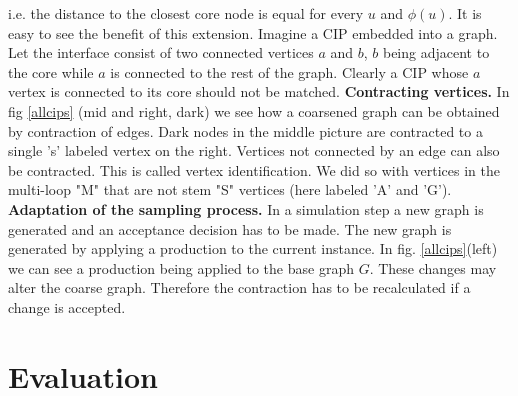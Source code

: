 \documentclass{article}
\begin{document}
i.e. the distance 
to the closest core node is equal for every
$u$ and $\phi(u)$.
It is easy to see the benefit of this extension.
Imagine a CIP embedded into a graph. Let the interface consist of
two connected vertices $a$ and $b$, $b$ being adjacent to the core while
$a$ is connected to the rest of the graph.
Clearly a CIP whose $a$ vertex is connected to its core should not be matched.
\textbf{Contracting vertices.}
In fig \ref{allcips} (mid and right, dark) we see how a coarsened 
graph can be obtained by contraction of edges.
Dark nodes in the middle picture are contracted to a single 's' labeled
vertex on the right. 
Vertices not connected by an edge can also be contracted.
This is called vertex identification.  
We did so with vertices in the multi-loop "M" that are not stem "S" vertices 
(here labeled 'A' and 'G').
\textbf{Adaptation of the sampling process.}
In a simulation step a new graph is generated and an acceptance decision
has to be made. The new graph is generated by applying a
production to the current instance. 
In fig. \ref{allcips}(left) we can see a production being applied
to the base graph $G$. 
These changes may alter the coarse graph.
Therefore the contraction has to be recalculated if a change is accepted.





\section{Evaluation}
\end{document}
